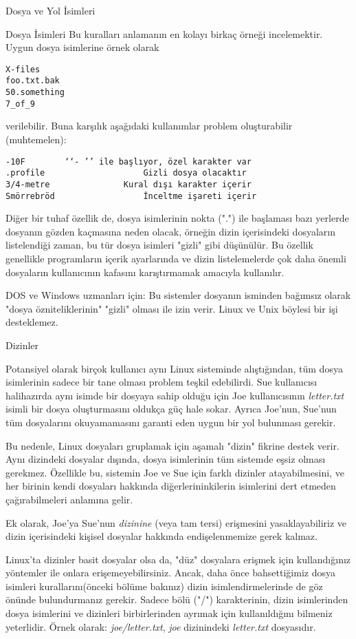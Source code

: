 \begin{section}{Dosya ve Yol İsimleri}
\begin{subsection}{Dosya İsimleri}
Bu kuralları anlamanın en kolayı birkaç örneği incelemektir. Uygun dosya isimlerine örnek olarak
\begin{verbatim}
X-files
foo.txt.bak
50.something
7_of_9
\end{verbatim}
verilebilir. Buna karşılık aşağıdaki kullanımlar problem oluşturabilir (muhtemelen):
\begin{verbatim}
-10F 		‘‘- ’’ ile başlıyor, özel karakter var
.profile 					Gizli dosya olacaktır
3/4-metre 				Kural dışı karakter içerir
Smörrebröd 					İnceltme işareti içerir
\end{verbatim}

Diğer bir tuhaf özellik de, dosya isimlerinin nokta (".") ile başlaması bazı yerlerde dosyanın gözden kaçmasına neden olacak, örneğin dizin içerisindeki dosyaların listelendiği zaman, bu tür dosya isimleri "gizli" gibi düşünülür. Bu özellik genellikle programların içerik ayarlarında ve dizin listelemelerde çok daha önemli dosyaların kullanıcının kafasını karıştırmamak amacıyla kullanılır.

DOS ve Windows uzmanları için: Bu sistemler dosyanın isminden bağımsız olarak "dosya özniteliklerinin" "gizli" olması ile izin verir. Linux ve Unix böylesi bir işi desteklemez.
\end{subsection}
\begin{subsection}{Dizinler}

Potansiyel olarak birçok kullanıcı aynı Linux sisteminde alıştığından, tüm dosya isimlerinin sadece bir tane olması problem teşkil edebilirdi. Sue kullanıcısı halihazırda aynı isimde bir dosyaya sahip olduğu için Joe kullanıcısının \emph{letter.txt} isimli bir dosya oluşturmasını oldukça güç hale sokar. Ayrıca Joe'nun, Sue'nun tüm dosyalarını okuyamamasını garanti eden uygun bir yol bulunması gerekir.

	Bu nedenle, Linux dosyaları gruplamak için aşamalı  "dizin" fikrine destek verir. Aynı dizindeki dosyalar dışında, dosya isimlerinin  tüm sistemde eşsiz olması gerekmez. Özellikle bu, sistemin Joe ve Sue için farklı dizinler atayabilmesini, ve her birinin kendi dosyaları hakkında diğerlerininkilerin isimlerini dert etmeden çağırabilmeleri anlamına gelir.
	
	Ek olarak, Joe'ya Sue'nun \emph{dizinine} (veya tam tersi) erişmesini yasaklayabiliriz ve dizin içerisindeki kişisel dosyalar hakkında endişelenmemize gerek kalmaz.
	
	Linux'ta dizinler basit dosyalar olsa da, "düz" dosyalara erişmek için kullandığınız yöntemler ile onlara erişemeyebilirsiniz. Ancak, daha önce bahsettiğimiz dosya isimleri kurallarını(önceki bölüme bakınız) dizin isimlendirmelerinde de göz önünde bulundurmanız gerekir. Sadece bölü ("/") karakterinin, dizin isimlerinden dosya isimlerini ve dizinleri birbirlerinden ayrımak için kullanıldığını bilmeniz yeterlidir. Örnek olarak: \emph{joe/letter.txt}, \emph{joe} dizinindeki \emph{letter.txt} dosyasıdır.
	

\end{subsection}
\end{section}
